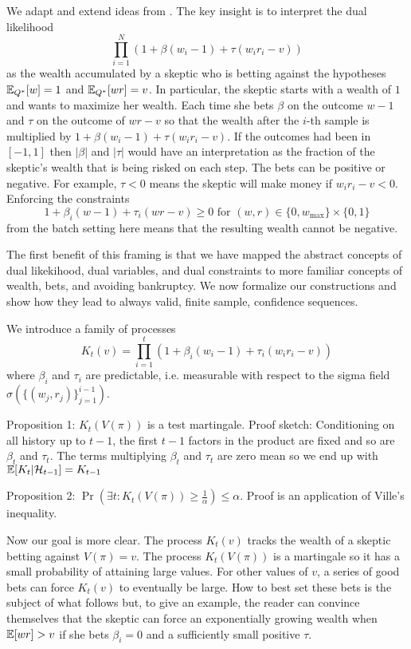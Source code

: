 We adapt and extend ideas from \cite{waudby-smith_variance-adaptive_2020}.
The key insight is to interpret the dual likelihood
\[
\prod_{i=1}^N (1+\beta(w_i-1)+\tau(w_i r_i - v))
\]
as the wealth accumulated by a skeptic who is betting against the
hypotheses $\mathbb{E}_{Q^*}[w]=1$ and $\mathbb{E}_{Q^*}[wr]=v$. In particular,
the skeptic starts with a wealth of $1$ and wants to 
maximize her wealth. Each time she
bets $\beta$ on the outcome $w-1$ and $\tau$
on the outcome of $wr-v$ so that the wealth after
the $i$-th sample is multiplied by $1+\beta(w_i-1)+\tau (w_i r_i -v)$. If the outcomes had been in $[-1,1]$ then
$|\beta|$ and $|\tau|$ would have an interpretation as 
the fraction of the skeptic's wealth that is being risked 
on each step. The bets can be positive
or negative. For example, $\tau<0$ means 
the skeptic will make money if $w_ir_i-v<0$.
Enforcing the constraints 
\[
1+\beta_i (w-1)+\tau_i (wr-v)\geq 0 
\textrm{ for } (w,r) \in \{0,w_{\max}\}\times\{0,1\}
\]
from the batch setting here means that 
the resulting wealth cannot be negative.

The first
benefit of this framing is that we have 
mapped the abstract concepts of dual likekihood,
dual variables, and dual constraints to more familiar 
concepts of wealth, bets, and avoiding bankruptcy. 
We now formalize our constructions and
show how they lead to always valid, finite sample, 
confidence sequences.

We introduce a family of processes
\[
K_t(v) = \prod_{i=1}^t (1+\beta_i (w_i-1) +\tau_i(w_i r_i - v))
\]
where $\beta_i$ and $\tau_i$ are predictable, i.e. measurable
with respect to the sigma field $\sigma(\{(w_j,r_j)\}_{j=1}^{i-1})$.

Proposition 1: $K_t(V(\pi))$ is a test martingale. Proof sketch:
Conditioning on all history up to 
$t-1$, the first $t-1$ factors in the product are fixed and so are $\beta_t$ and $\tau_t$. The terms multiplying $\beta_t$ and $\tau_t$ are zero mean
so we end up with $\mathbb{E}[K_t|\mathcal{H}_{t-1}] = K_{t-1}$

Proposition 2: $\Pr(\exists t: K_t(V(\pi)) \geq \frac{1}{\alpha})\leq \alpha$. Proof is an application of Ville's inequality.

Now our goal is more clear. The process $K_t(v)$ tracks the wealth
of a skeptic betting against
$V(\pi)=v$. The process $K_t(V(\pi))$ is a martingale so it has
a small probability of attaining large values. For other values 
of $v$, a series of good bets can force $K_t(v)$ to eventually
be large. How to best set these bets is the subject of what follows
but, to give an example, the reader can convince themselves that 
the skeptic can force an exponentially growing wealth when $\mathbb{E}[wr]>v$ 
if she bets $\beta_i=0$ and a sufficiently small positive $\tau$. 

